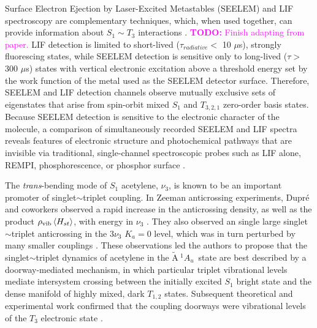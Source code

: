 \documentclass[12pt,draft]{mitthesis}
\newcommand{\TODO} [1]{\textcolor{magenta}{\textbf{TODO:} #1}}
\newcommand{\rcm}{cm$^{-1}$}
\newcommand{\astate}{$
  \tilde{\text{A}} \: ^1\!A_u
  $}
\newcommand{\StoS}{$
  S_1 \leftarrow S_0
  $}
\newcommand{\microsec}{$\mu$s}
\begin{document}
Surface Electron Ejection by Laser-Excited Metastables \cite{sneh89,
  sneh91, humphrey97} (SEELEM) and LIF spectroscopy are complementary
techniques, which, when used together, can provide information about
$S_1 \sim T_3$ interactions \cite{humphrey97, mishra04, altunata00,
  altunata02}.  \TODO{Finish adapting from paper.}  LIF detection is
limited to short-lived ($\tau_{radiative}<$ 10 \microsec), strongly
fluorescing states, while SEELEM detection is sensitive only to
long-lived ($\tau >$ 300 \microsec) states with vertical electronic
excitation above a threshold energy set by the work function of the
metal used as the SEELEM detector surface. Therefore, SEELEM and LIF
detection channels observe mutually exclusive sets of eigenstates that
arise from spin-orbit mixed $S_1$ and $T_{3,2,1}$ zero-order basis
states.  Because SEELEM detection is sensitive to the electronic
character of the molecule, a comparison of simultaneously recorded
SEELEM and LIF spectra reveals features of electronic structure and
photochemical pathways that are invisible via traditional,
single-channel spectroscopic probes such as LIF alone, REMPI,
phosphorescence, or phosphor surface \cite{shi98, campos01, burton72}.

The \emph{trans}-bending mode of $S_1$ acetylene, $\nu_3$, is known to
be an important promoter of singlet$\sim$triplet coupling.  In Zeeman
anticrossing experiments, Dupr\'{e} and coworkers observed a rapid
increase in the anticrossing density, as well as the product
$\rho_{\text{vib}} \mathinner{\langle{H_{st}}\rangle}$, with energy in $\nu_3$
\cite{dupre91, dupre95b}.  They also observed an single large
singlet$\sim$triplet anticrossing in the $3 \nu_3$ $K_a=0$ level,
which was in turn perturbed by many smaller couplings \cite{dupre93}.
These observations led the authors to propose that the
singlet$\sim$triplet dynamics of acetylene in the \astate\ state are
best described by a doorway-mediated mechanism, in which particular
triplet vibrational levels mediate intersystem crossing between the
initially excited $S_1$ bright state and the dense manifold of highly
mixed, dark $T_{1,2}$ states.  Subsequent theoretical and experimental
work confirmed that the coupling doorways were vibrational levels of
the $T_3$ electronic state \cite{vacek96, sherrill96, humphrey97,
  altunata00}.
\end{document}
